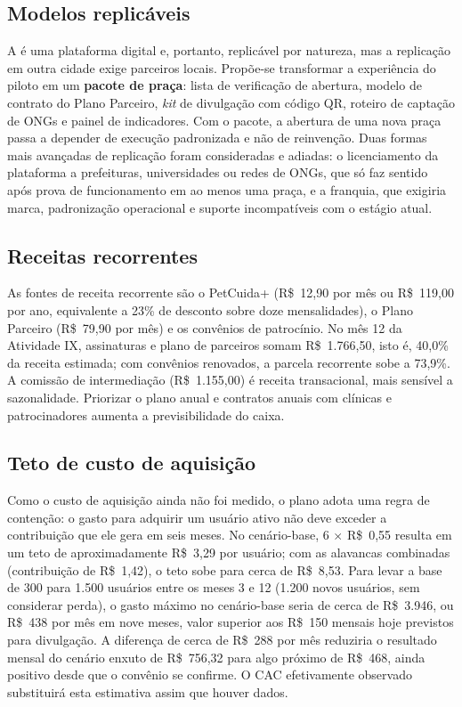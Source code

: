 \subsection{Modelos replicáveis}

A \projeto{} é uma plataforma digital e, portanto, replicável por natureza, mas a replicação em outra cidade exige parceiros locais. Propõe-se transformar a experiência do piloto em um \textbf{pacote de praça}: lista de verificação de abertura, modelo de contrato do Plano Parceiro, \textit{kit} de divulgação com código QR, roteiro de captação de ONGs e painel de indicadores. Com o pacote, a abertura de uma nova praça passa a depender de execução padronizada e não de reinvenção. Duas formas mais avançadas de replicação foram consideradas e adiadas: o licenciamento da plataforma a prefeituras, universidades ou redes de ONGs, que só faz sentido após prova de funcionamento em ao menos uma praça, e a franquia, que exigiria marca, padronização operacional e suporte incompatíveis com o estágio atual.

\subsection{Receitas recorrentes}

As fontes de receita recorrente são o PetCuida+ (R\$~12,90 por mês ou R\$~119,00 por ano, equivalente a 23\% de desconto sobre doze mensalidades), o Plano Parceiro (R\$~79,90 por mês) e os convênios de patrocínio. No mês 12 da Atividade IX, assinaturas e plano de parceiros somam R\$~1.766,50, isto é, 40,0\% da receita estimada; com convênios renovados, a parcela recorrente sobe a 73,9\%. A comissão de intermediação (R\$~1.155,00) é receita transacional, mais sensível a sazonalidade. Priorizar o plano anual e contratos anuais com clínicas e patrocinadores aumenta a previsibilidade do caixa.

\subsection{Teto de custo de aquisição}
\label{sub:cac}

Como o custo de aquisição ainda não foi medido, o plano adota uma regra de contenção: o gasto para adquirir um usuário ativo não deve exceder a contribuição que ele gera em seis meses. No cenário-base, 6 $\times$ R\$~0,55 resulta em um teto de aproximadamente R\$~3,29 por usuário; com as alavancas combinadas (contribuição de R\$~1,42), o teto sobe para cerca de R\$~8,53. Para levar a base de 300 para 1.500 usuários entre os meses 3 e 12 (1.200 novos usuários, sem considerar perda), o gasto máximo no cenário-base seria de cerca de R\$~3.946, ou R\$~438 por mês em nove meses, valor superior aos R\$~150 mensais hoje previstos para divulgação. A diferença de cerca de R\$~288 por mês reduziria o resultado mensal do cenário enxuto de R\$~756,32 para algo próximo de R\$~468, ainda positivo desde que o convênio se confirme. O CAC efetivamente observado substituirá esta estimativa assim que houver dados.

